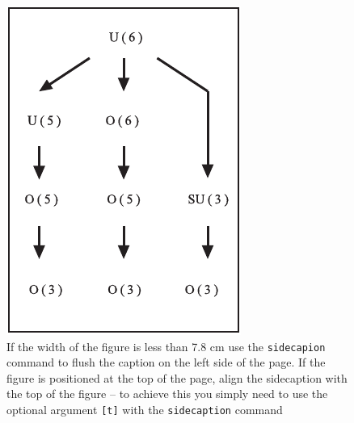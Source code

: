 \begin{figure}[t] %
\sidecaption[t]
\includegraphics[scale=.65]{figure}
%
%
\caption{If the width of the figure is less than 7.8 cm use the \texttt{sidecapion} command to flush the caption on the left side of the page. If the figure is positioned at the top of the page, align the sidecaption with the top of the figure -- to achieve this you simply need to use the optional argument \texttt{[t]} with the \texttt{sidecaption} command}
\label{fig:2}       %
\end{figure}


